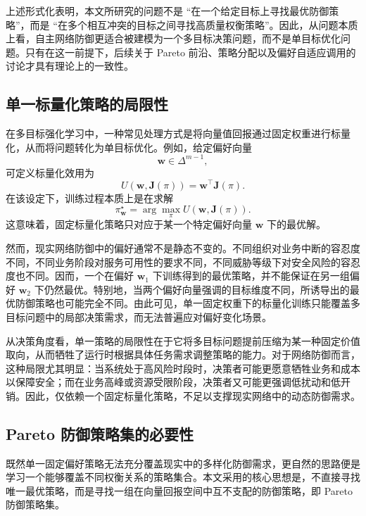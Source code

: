 \documentclass[12pt,a4paper]{article}
\begin{document}
上述形式化表明，本文所研究的问题不是 ``在一个给定目标上寻找最优防御策略''，而是 ``在多个相互冲突的目标之间寻找高质量权衡策略''。因此，从问题本质上看，自主网络防御更适合被建模为一个多目标决策问题，而不是单目标优化问题。只有在这一前提下，后续关于 Pareto 前沿、策略分配以及偏好自适应调用的讨论才具有理论上的一致性。

\subsection{单一标量化策略的局限性}

在多目标强化学习中，一种常见处理方式是将向量值回报通过固定权重进行标量化，从而将问题转化为单目标优化。例如，给定偏好向量
\begin{equation}
\mathbf{w} \in \Delta^{m-1},
\end{equation}
可定义标量化效用为
\begin{equation}
U(\mathbf{w}, \mathbf{J}(\pi))
=
\mathbf{w}^{\top}\mathbf{J}(\pi).
\end{equation}
在该设定下，训练过程本质上是在求解
\begin{equation}
\pi_{\mathbf{w}}^{\star}
=
\arg\max_{\pi} U(\mathbf{w}, \mathbf{J}(\pi)).
\end{equation}
这意味着，固定标量化策略只对应于某一个特定偏好向量 $\mathbf{w}$ 下的最优解。

然而，现实网络防御中的偏好通常不是静态不变的。不同组织对业务中断的容忍度不同，不同业务阶段对服务可用性的要求不同，不同威胁等级下对安全风险的容忍度也不同。因而，一个在偏好 $\mathbf{w}_1$ 下训练得到的最优策略，并不能保证在另一组偏好 $\mathbf{w}_2$ 下仍然最优。特别地，当两个偏好向量强调的目标维度不同，所诱导出的最优防御策略也可能完全不同。由此可见，单一固定权重下的标量化训练只能覆盖多目标问题中的局部决策需求，而无法普遍应对偏好变化场景。

从决策角度看，单一策略的局限性在于它将多目标问题提前压缩为某一种固定价值取向，从而牺牲了运行时根据具体任务需求调整策略的能力。对于网络防御而言，这种局限尤其明显：当系统处于高风险时段时，决策者可能更愿意牺牲业务和成本以保障安全；而在业务高峰或资源受限阶段，决策者又可能更强调低扰动和低开销。因此，仅依赖一个固定标量化策略，不足以支撑现实网络中的动态防御需求。

\subsection{Pareto 防御策略集的必要性}

既然单一固定偏好策略无法充分覆盖现实中的多样化防御需求，更自然的思路便是学习一个能够覆盖不同权衡关系的策略集合。本文采用的核心思想是，不直接寻找唯一最优策略，而是寻找一组在向量回报空间中互不支配的防御策略，即 Pareto 防御策略集。
\end{document}
